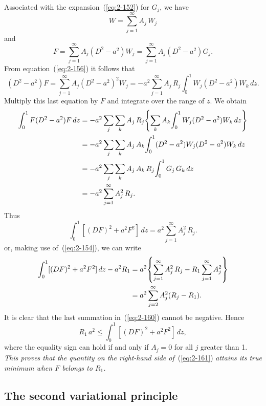 Associated with the expansion~(\ref{eq:2-152}) for $G_j$, we have
\begin{equation}
\label{eq:2-155}
W = \sum_{j=1}^{\infty} A_j\,W_j
\end{equation}
and
\begin{equation}
\label{eq:2-156}
F = \sum_{j=1}^{\infty} A_j(D^2-a^2)W_j = \sum_{j=1}^{\infty} A_j(D^2-a^2)G_j.
\end{equation}
From equation~(\ref{eq:2-156}) it follows that
\begin{equation}
\label{eq:2-157}
(D^2-a^2)F = \sum_{j=1}^{\infty} A_j(D^2-a^2)^2 W_j = -a^2\sum_{j=1}^{\infty} A_j\,R_j\!\int_0^1 W_j(D^2-a^2)W_k\,dz.
\end{equation}
Multiply this last equation by $F$ and integrate over the range of $z$. We
obtain
\begin{align}
\label{eq:2-158}
\int_0^1 F(D^2-a^2)F\,dz &= -a^2\sum_j\sum_k A_j\,R_j\!\left\{\sum_k A_k\!\int_0^1 W_j(D^2-a^2)W_k\,dz\right\} \notag\\
&= -a^2\sum_j\sum_k A_j\,A_k\!\int_0^1 (D^2-a^2)W_j(D^2-a^2)W_k\,dz \notag\\
&= -a^2\sum_j\sum_k A_j\,A_k\,R_j\!\int_0^1 G_j\,G_k\,dz \notag\\
&= -a^2\sum_{j=1}^{\infty} A_j^2\,R_j.
\end{align}
Thus
\begin{equation}
\label{eq:2-159}
\int_0^1[(DF)^2+a^2 F^2]\,dz = a^2\sum_{j=1}^{\infty} A_j^2\,R_j.
\end{equation}
or, making use of~(\ref{eq:2-154}), we can write
\begin{align}
\label{eq:2-160}
\int_0^1[(DF)^2+a^2 F^2]\,dz - a^2 R_1 &= a^2\!\left\{\sum_{j=1}^{\infty} A_j^2\,R_j - R_1\sum_{j=1}^{\infty} A_j^2\right\} \notag\\
&= a^2\sum_{j=2}^{\infty} A_j^2(R_j - R_1).
\end{align}
It is clear that the last summation in~(\ref{eq:2-160}) cannot be negative. Hence
\begin{equation}
\label{eq:2-161}
R_1\,a^2 \leqslant \int_0^1[(DF)^2+a^2 F^2]\,dz,
\end{equation}
where the equality sign can hold if and only if $A_j = 0$ for all $j$ greater
than 1. \emph{This proves that the quantity on the right-hand side of}~(\ref{eq:2-161}) \emph{attains
its true minimum when $F$ belongs to $R_1$.}

\subsection{The second variational principle}\label{sec:13b}

